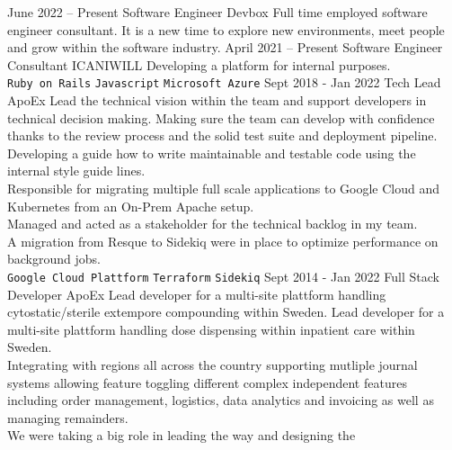 \documentclass[9pt]{template} %
\begin{document}
\begin{entrylist}
  \entry
    {June 2022 -- Present}
    {Software Engineer}
    {Devbox}
    {Full time employed software engineer consultant. It is a new time to
      explore new environments, meet people and grow within the software
      industry.
      }
  \entry
    {April 2021 -- Present}
    {Software Engineer Consultant}
    {ICANIWILL}
    {Developing a platform for internal purposes.\\
      \texttt{Ruby on Rails}\slashsep
      \texttt{Javascript}\slashsep
      \texttt{Microsoft Azure}
    }
  \entry
    {Sept 2018 - Jan 2022}
    {Tech Lead}
    {ApoEx}
    {Lead the technical vision within the team and support developers in
      technical decision making. Making sure the team can develop with
      confidence thanks to the review process and the solid test suite and
      deployment pipeline. Developing a guide how to write maintainable
      and testable code using the internal style guide lines.\\
      Responsible for migrating multiple full scale applications to Google Cloud
      and Kubernetes from an On-Prem Apache setup.\\
      Managed and acted as a stakeholder for the technical backlog in my team.\\
      A migration from Resque to Sidekiq were in place to optimize performance
      on background jobs.\\
      \texttt{Google Cloud Plattform}\slashsep
      \texttt{Terraform}\slashsep
      \texttt{Sidekiq}
    }
  \entry
    {Sept 2014 - Jan 2022}
    {Full Stack Developer}
    {ApoEx}
    {Lead developer for a multi-site plattform handling cytostatic/sterile
      extempore compounding within Sweden.
      Lead developer for a multi-site plattform handling dose dispensing within
      inpatient care within Sweden.\\
      Integrating with regions all across the country supporting mutliple
      journal systems allowing feature toggling different complex independent
      features including order management, logistics, data analytics and
      invoicing as well as managing remainders.\\
      We were taking a big role in leading the way and designing the
}
\end{entrylist}
\end{document}

